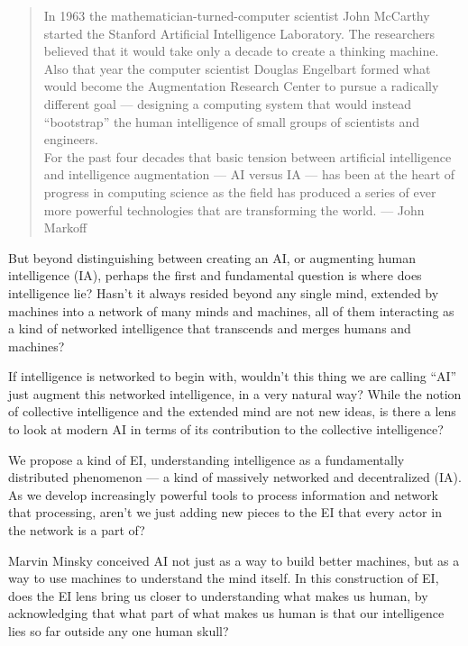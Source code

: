 \begin{quote}In 1963 the mathematician-turned-computer scientist John McCarthy started the Stanford Artificial Intelligence Laboratory. The researchers believed that it would take only a decade to create a thinking machine.\\
Also that year the computer scientist Douglas Engelbart formed what would become the Augmentation Research Center to pursue a radically different goal --- designing a computing system that would instead ``bootstrap'' the human intelligence of small groups of scientists and engineers.\\
For the past four decades that basic tension between artificial intelligence and intelligence augmentation --- \ac{AI} versus IA --- has been at the heart of progress in computing science as the field has produced a series of ever more powerful technologies that are transforming the world. 
--- John Markoff \cite{markoff2011fight}
\end{quote}

But beyond distinguishing between creating an \ac{AI}, or augmenting human intelligence (IA), perhaps the first and fundamental question is where does intelligence lie? Hasn't it always resided beyond any single mind, extended by machines into a network of many minds and machines, all of them interacting as a kind of networked intelligence \cite{BorgStar88:online} that transcends and merges humans and machines?

If intelligence is networked to begin with, wouldn't this thing we are calling ``AI'' just augment this networked intelligence, in a very natural way? While the notion of collective intelligence and the extended mind are not new ideas, is there a lens to look at modern \ac{AI} in terms of its contribution to the collective intelligence?

We propose a kind of \ac{EI}, understanding intelligence as a fundamentally distributed phenomenon --- a kind of massively networked and decentralized (IA). As we develop increasingly powerful tools to process information and network that processing, aren't we just adding new pieces to the EI that every actor in the network is a part of?

Marvin Minsky conceived \ac{AI} not just as a way to build better machines, but as a way to use machines to understand the mind itself. In this construction of \ac{EI}, does the \ac{EI} lens bring us closer to understanding what makes us human, by acknowledging that what part of what makes us human is that our intelligence lies so far outside any one human skull?

